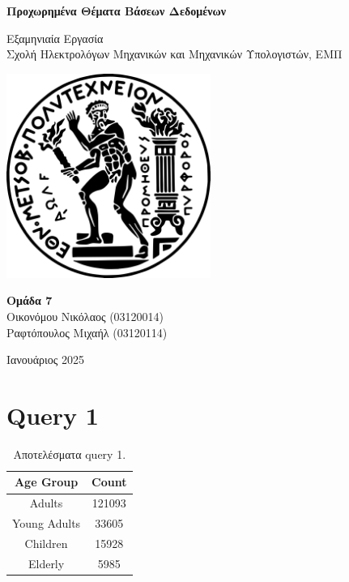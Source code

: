 \documentclass[a4paper,12pt]{article}
\begin{document}
\begin{otherlanguage}{greek}

\begin{titlepage}
    	\centering
    	\vspace*{2cm}

    	\Huge
    	\textbf{Προχωρημένα Θέματα Βάσεων Δεδομένων}

    	\vspace{0.5cm}
    	\LARGE
    	Εξαμηνιαία Εργασία \\
    	Σχολή Ηλεκτρολόγων Μηχανικών και Μηχανικών Υπολογιστών, ΕΜΠ

    	\vspace{1.5cm}
    	\includegraphics[width=0.5\textwidth]{ntua.png}

    	\vfill

   	\Large
	\textbf{Ομάδα 7} \\
	Οικονόμου Νικόλαος (03120014) \\
	Ραφτόπουλος Μιχαήλ (03120114) \\

	\vfill

	\normalsize
    	Ιανουάριος 2025

    	\vspace{0.8cm}
\end{titlepage}

\newpage

\tableofcontents
\newpage


\section*{Query 1}
	\lipsum[1]
	\FloatBarrier
	\begin{table}[h]
		\centering
		\begin{tabular}{cc}
			Age Group & Count \\
			\hline
			Adults & 121093 \\
			Young Adults & 33605 \\
			Children & 15928 \\
			Elderly & 5985
		\end{tabular}
		\caption{Αποτελέσματα query 1.}
	\end{table}
	\FloatBarrier



\end{otherlanguage}
\end{document}
